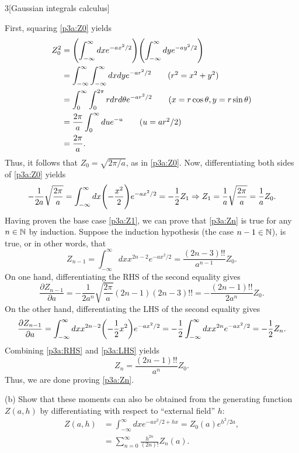 \documentclass[12pt]{article}
\begin{document}
\begin{problem}{3}[Gaussian integrals calculus]
\begin{solution}
First, squaring \eqref{p3a:Z0} yields
\begin{align}
    Z_0^2
    &=\qty(\int_{-\infty}^\infty dxe^{-ax^2/2})\qty(\int_{-\infty}^\infty
    dye^{-ay^2/2})\notag\\
    &=\int_{-\infty}^\infty\int_{-\infty}^\infty dxdy
    e^{-ar^2/2}\tag{$r^2=x^2+y^2$}\\
    &=\int_0^\infty\int_0^{2\pi}rdrd\theta
    e^{-ar^2/2}\tag{$x=r\cos\theta,y=r\sin\theta$}\\
    &=\frac{2\pi}{a}\int_0^\infty du e^{-u}\tag{$u=ar^2/2$}\\
    &=\frac{2\pi}{a}.
\end{align}
Thus, it follows that $Z_0=\sqrt{2\pi/a}$, as in \eqref{p3a:Z0}. Now,
differentiating both sides of \eqref{p3a:Z0} yields
\begin{equation}
    -\frac1{2a}\sqrt{\frac{2\pi}{a}}=\int_{-\infty}^\infty
    dx\qty(-\frac{x^2}{2})e^{-ax^2/2}=-\frac12Z_1
    \Rightarrow Z_1=\frac1a\sqrt{\frac{2\pi}{a}}=\frac1aZ_0.
\end{equation}
Having proven the base case \eqref{p3a:Z1}, we can prove that \eqref{p3a:Zn} is
true for any $n\in\mathbb{N}$ by induction. Suppose the induction hypothesis (the
case $n-1\in\mathbb{N}$), is true, or in other words, that
\begin{equation}
    Z_{n-1}=\int_{-\infty}^\infty dx x^{2n-2}e^{-ax^2/2}
    =\frac{(2n-3)!!}{a^{n-1}}Z_0.
\end{equation}
On one hand, differentiating the RHS of the second equality gives
\begin{equation}\label{p3a:RHS}
    \frac{\partial Z_{n-1}}{\partial
    a}=-\frac1{2a^n}\sqrt{\frac{2\pi}{a}}(2n-1)(2n-3)!!
    =-\frac{(2n-1)!!}{2a^n}Z_0.
\end{equation}
On the other hand, differentiating the LHS of the second equality gives
\begin{equation}\label{p3a:LHS}
    \frac{\partial Z_{n-1}}{\partial a}
    =\int_{-\infty}^\infty dxx^{2n-2}\qty(-\frac12x^2)e^{-ax^2/2}
    =-\frac12\int_{-\infty}^\infty dxx^{2n}e^{-ax^2/2}
    =-\frac12Z_{n}.
\end{equation}
Combining \eqref{p3a:RHS} and \eqref{p3a:LHS} yields
\begin{equation}
    Z_n=\frac{(2n-1)!!}{a^n}Z_0 .
\end{equation}
Thus, we are done proving \eqref{p3a:Zn}.
\end{solution}

(b) Show that these moments can also be obtained from the generating function
$Z(a,h)$ by differentiating with respect to ``external field'' $h$:
\begin{align}
    Z(a,h)&=\int_{-\infty}^\infty dx
    e^{-ax^2/2+hx}=Z_0(a)e^{h^2/2a},\label{p3b:Za}\\
          &=\sum_{n=0}^\infty\frac{h^{2n}}{(2n)!}Z_n(a).
\end{align}


\end{problem}
\end{document}
